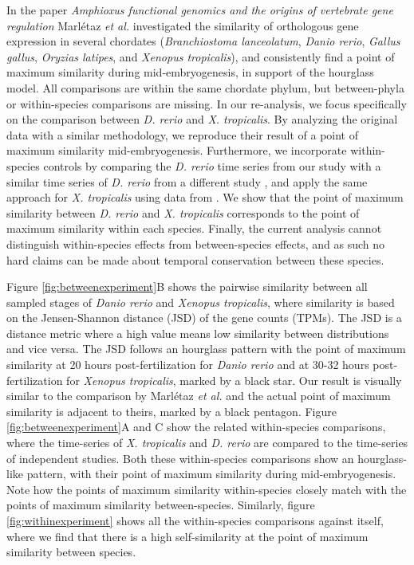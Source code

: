 In the paper \textit{Amphioxus functional genomics and the origins of vertebrate gene regulation}\cite{marletaz2018} Marl\'etaz \textit{et al.} investigated the similarity of orthologous gene expression in several chordates (\textit{Branchiostoma lanceolatum}, \textit{Danio rerio}, \textit{Gallus gallus}, \textit{Oryzias latipes}, and \textit{Xenopus tropicalis}), and consistently find a point of maximum similarity during mid-embryogenesis, in support of the hourglass model. All comparisons are within the same chordate phylum, but between-phyla or within-species comparisons are missing. In our re-analysis, we focus specifically on the comparison between \textit{D. rerio} and \textit{X. tropicalis}. By analyzing the original data with a similar methodology, we reproduce their result of a point of maximum similarity mid-embryogenesis. Furthermore, we incorporate within-species controls by comparing the \textit{D. rerio} time series from our study with a similar time series of \textit{D. rerio} from a different study \cite{White2017}, and apply the same approach for \textit{X. tropicalis} using data from \cite{Hu2017}. We show that the point of maximum similarity between \textit{D. rerio} and \textit{X. tropicalis} corresponds to the point of maximum similarity within each species. Finally, the current analysis cannot distinguish within-species effects from between-species effects, and as such no hard claims can be made about temporal conservation between these species.

Figure \ref{fig:betweenexperiment}B shows the pairwise similarity between all sampled stages of \textit{Danio rerio} and \textit{Xenopus tropicalis}, where similarity is based on the Jensen-Shannon distance (JSD) of the gene counts (TPMs). The JSD is a distance metric where a high value means low similarity between distributions and vice versa. The JSD follows an hourglass pattern with the point of maximum similarity at 20 hours post-fertilization for \textit{Danio rerio} and at 30-32 hours post-fertilization for \textit{Xenopus tropicalis}, marked by a black star. Our result is visually similar to the comparison by Marl\'etaz \textit{et al.} and the actual point of maximum similarity is adjacent to theirs, marked by a black pentagon. Figure \ref{fig:betweenexperiment}A and C show the related within-species comparisons, where the time-series of \textit{X. tropicalis} and \textit{D. rerio} are compared to the time-series of independent studies\cite{Hu2017,White2017}. Both these within-species comparisons show an hourglass-like pattern, with their point of maximum similarity during mid-embryogenesis. Note how the points of maximum similarity within-species closely match with the points of maximum similarity between-species. Similarly, figure \ref{fig:withinexperiment} shows all the within-species comparisons against itself, where we find that there is a high self-similarity at the point of maximum similarity between species. 

